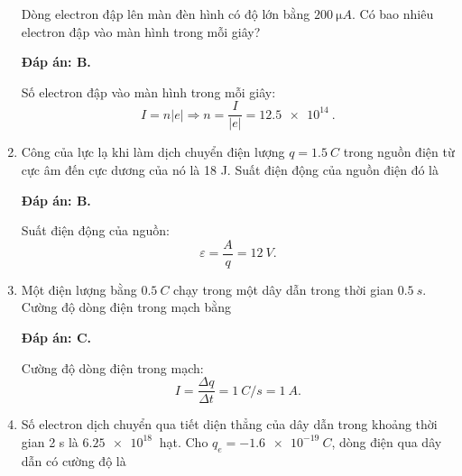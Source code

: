 \begin{enumerate}[label=\bfseries Câu \arabic*:]
	\cauhoi
	{Dòng electron đập lên màn đèn hình có độ lớn bằng $\SI{200}{\micro A}$. Có bao nhiêu electron đập vào màn hình trong mỗi giây?
		
	}
	\loigiai
	{	\textbf{Đáp án: B.}
		
		Số electron đập vào màn hình trong mỗi giây:
		$$I=n|e| \Rightarrow n = \dfrac{I}{|e|} = \SI{12.5e14}{}.$$
	}
	\item {}
	
	\cauhoi
	{Công của lực lạ khi làm dịch chuyển điện lượng $q=\SI{1.5}{C}$ trong nguồn điện từ cực âm đến cực dương của nó là 18 J. Suất điện động của nguồn điện đó là
		
	}
	\loigiai
	{	\textbf{Đáp án: B.}
		
		Suất điện động của nguồn:
		$$\varepsilon = \dfrac{A}{q} = \SI{12}{V}.$$
	}
	\item {}
	
	\cauhoi
	{Một điện lượng bằng $\SI{0.5}{C}$ chạy trong một dây dẫn trong thời gian $\SI{0.5}{s}$. Cường độ dòng điện trong mạch bằng
		
	}
	\loigiai
	{	\textbf{Đáp án: C.}
		
		Cường độ dòng điện trong mạch:
		$$I=\dfrac{\Delta q}{\Delta t} = \SI{1}{C/s} = \SI{1}{A}.$$
	}
	\item {}
	
	\cauhoi
	{Số electron dịch chuyển qua tiết diện thẳng của dây dẫn trong khoảng thời gian 2 s là $\SI{6.25e18}{}$ hạt. Cho $q_e=\SI{-1.6e-19}{C}$, dòng điện qua dây dẫn có cường độ là
		
}
\end{enumerate}
